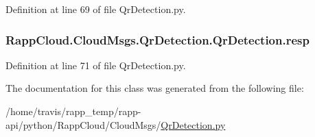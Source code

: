 Definition at line 69 of file Qr\-Detection.\-py.

\hypertarget{classRappCloud_1_1CloudMsgs_1_1QrDetection_1_1QrDetection_ac7cd07b0620c8a9306e1e40f6ed359f8}{
\subsubsection[{resp}]{\setlength{\rightskip}{0pt plus 5cm}Rapp\-Cloud.\-Cloud\-Msgs.\-Qr\-Detection.\-Qr\-Detection.\-resp}}\label{classRappCloud_1_1CloudMsgs_1_1QrDetection_1_1QrDetection_ac7cd07b0620c8a9306e1e40f6ed359f8}


Definition at line 71 of file Qr\-Detection.\-py.



The documentation for this class was generated from the following file\-:\begin{DoxyCompactItemize}
\item 
/home/travis/rapp\-\_\-temp/rapp-\/api/python/\-Rapp\-Cloud/\-Cloud\-Msgs/\hyperlink{QrDetection_8py}{Qr\-Detection.\-py}\end{DoxyCompactItemize}
